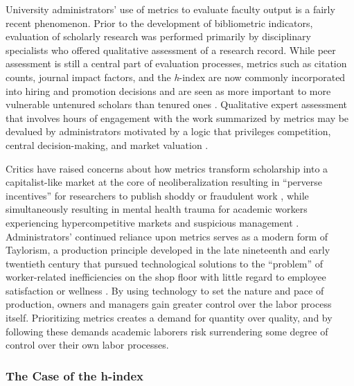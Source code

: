 \documentclass[
  10pt,
  letterpaper,
]{article}
\begin{document}
University administrators' use of metrics to evaluate faculty output is
a fairly recent phenomenon. Prior to the development of bibliometric
indicators, evaluation of scholarly research was performed primarily by
disciplinary specialists who offered qualitative assessment of a
research record. While peer assessment is still a central part of
evaluation processes, metrics such as citation counts, journal impact
factors, and the \emph{h}-index are now commonly incorporated into
hiring and promotion decisions \citep{mckiernan_metaresearch_2019} and
are seen as more important to more vulnerable untenured scholars than
tenured ones \citep{niles_why_2020}. Qualitative expert assessment that
involves hours of engagement with the work summarized by metrics may be
devalued by administrators motivated by a logic that privileges
competition, central decision-making, and market valuation
\citep{berg_producing_2016}.

Critics have raised concerns about how metrics transform scholarship
into a capitalist-like market at the core of neoliberalization resulting
in ``perverse incentives'' for researchers to publish shoddy or
fraudulent work \citep{edwards_academic_2017}, while simultaneously
resulting in mental health trauma for academic workers experiencing
hypercompetitive markets and suspicious management
\citep{forrester_mental_2021}. Administrators' continued reliance upon
metrics serves as a modern form of Taylorism, a production principle
developed in the late nineteenth and early twentieth century that
pursued technological solutions to the ``problem'' of worker-related
inefficiencies on the shop floor with little regard to employee
satisfaction or wellness \citep{braverman_labor_1998}. By using
technology to set the nature and pace of production, owners and managers
gain greater control over the labor process itself. Prioritizing metrics
creates a demand for quantity over quality, and by following these
demands academic laborers risk surrendering some degree of control over
their own labor processes.

\subsubsection{The Case of the h-index}\label{the-case-of-the-h-index}
\end{document}
